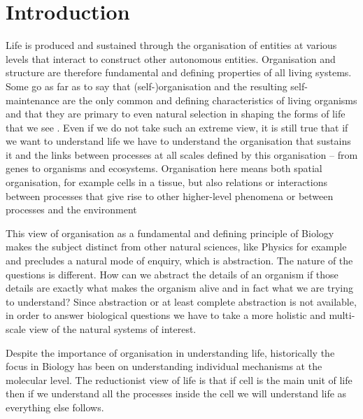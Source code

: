 \documentclass[phd]{infthesis}
\begin{document}
\chapter{Introduction}
Life is produced and sustained through the organisation of entities at various
levels that interact to construct other autonomous entities. Organisation and
structure are therefore fundamental and defining properties of all living
systems. Some go as far as to say that (self-)organisation and the resulting
self-maintenance are the only common and defining characteristics of living
organisms and that they are primary to even natural selection in shaping the
forms of life that we see \citep[sometimes referred to as structuralism, for
example;][]{thompson1942growth, kauffman1992origins}. Even if we do not take
such an extreme view, it is still true that if we want to understand life we
have to understand the organisation that sustains it and the links between
processes at all scales defined by this organisation -- from genes to organisms
and ecosystems. Organisation here means both spatial organisation, for example
cells in a tissue, but also relations or interactions between processes that
give rise to other higher-level phenomena or between processes and the
environment

This view of organisation as a fundamental and defining principle of Biology
makes the subject distinct from other natural sciences, like Physics for example
and precludes a natural mode of enquiry, which is abstraction. The nature of the
questions is different. How can we abstract the details of an organism if those
details are exactly what makes the organism alive and in fact what we are trying
to understand? Since abstraction or at least complete abstraction is not
available, in order to answer biological questions we have to take a more
holistic and multi-scale view of the natural systems of interest.

Despite the importance of organisation in understanding life, historically the
focus in Biology has been on understanding individual mechanisms at the
molecular level. The reductionist view of life is that if cell is the main unit
of life then if we understand all the processes inside the cell we will
understand life as everything else follows.
\end{document}
